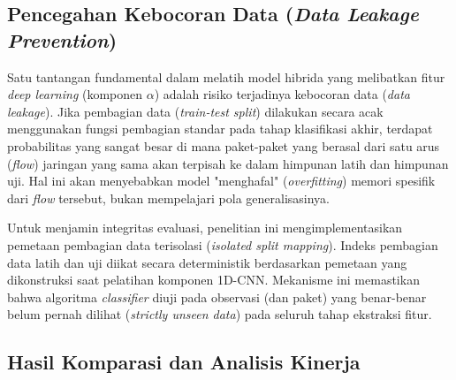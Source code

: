 \subsection{Pencegahan Kebocoran Data (\textit{Data Leakage Prevention})}

Satu tantangan fundamental dalam melatih model hibrida yang melibatkan fitur \textit{deep learning} (komponen $\alpha$) adalah risiko terjadinya kebocoran data (\textit{data leakage}). Jika pembagian data (\textit{train-test split}) dilakukan secara acak menggunakan fungsi pembagian standar pada tahap klasifikasi akhir, terdapat probabilitas yang sangat besar di mana paket-paket yang berasal dari satu arus (\textit{flow}) jaringan yang sama akan terpisah ke dalam himpunan latih dan himpunan uji. Hal ini akan menyebabkan model "menghafal" (\textit{overfitting}) memori spesifik dari \textit{flow} tersebut, bukan mempelajari pola generalisasinya.

Untuk menjamin integritas evaluasi, penelitian ini mengimplementasikan pemetaan pembagian data terisolasi (\textit{isolated split mapping}). Indeks pembagian data latih dan uji diikat secara deterministik berdasarkan pemetaan yang dikonstruksi saat pelatihan komponen 1D-CNN. Mekanisme ini memastikan bahwa algoritma \textit{classifier} diuji pada observasi (dan paket) yang benar-benar belum pernah dilihat (\textit{strictly unseen data}) pada seluruh tahap ekstraksi fitur.

\subsection{Hasil Komparasi dan Analisis Kinerja}

